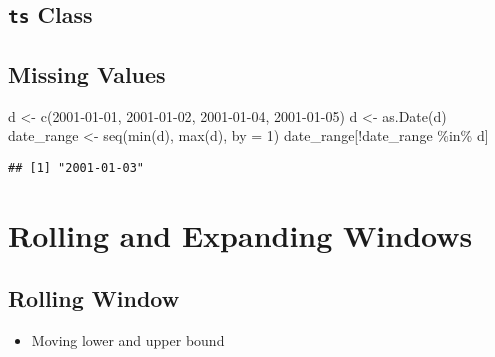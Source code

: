 \documentclass[
]{book}
\newenvironment{Shaded}{\begin{snugshade}}{\end{snugshade}}
\newcommand{\AttributeTok}[1]{\textcolor[rgb]{0.77,0.63,0.00}{#1}}
\newcommand{\DecValTok}[1]{\textcolor[rgb]{0.00,0.00,0.81}{#1}}
\newcommand{\FunctionTok}[1]{\textcolor[rgb]{0.00,0.00,0.00}{#1}}
\newcommand{\NormalTok}[1]{#1}
\newcommand{\OtherTok}[1]{\textcolor[rgb]{0.56,0.35,0.01}{#1}}
\newcommand{\SpecialCharTok}[1]{\textcolor[rgb]{0.00,0.00,0.00}{#1}}
\newcommand{\StringTok}[1]{\textcolor[rgb]{0.31,0.60,0.02}{#1}}
\providecommand{\tightlist}{%
  \setlength{\itemsep}{0pt}\setlength{\parskip}{0pt}}
\begin{document}
\hypertarget{ts-class}{%
\section{\texorpdfstring{\texttt{ts} Class}{ts Class}}\label{ts-class}}

\hypertarget{missing-values}{%
\section{Missing Values}\label{missing-values}}

\begin{Shaded}
\begin{Highlighting}[]
\NormalTok{d }\OtherTok{\textless{}{-}} \FunctionTok{c}\NormalTok{(}\StringTok{\textquotesingle{}2001{-}01{-}01\textquotesingle{}}\NormalTok{, }\StringTok{\textquotesingle{}2001{-}01{-}02\textquotesingle{}}\NormalTok{, }\StringTok{\textquotesingle{}2001{-}01{-}04\textquotesingle{}}\NormalTok{, }\StringTok{\textquotesingle{}2001{-}01{-}05\textquotesingle{}}\NormalTok{)}
\NormalTok{d }\OtherTok{\textless{}{-}} \FunctionTok{as.Date}\NormalTok{(d)}
\NormalTok{date\_range }\OtherTok{\textless{}{-}} \FunctionTok{seq}\NormalTok{(}\FunctionTok{min}\NormalTok{(d), }\FunctionTok{max}\NormalTok{(d), }\AttributeTok{by =} \DecValTok{1}\NormalTok{) }
\NormalTok{date\_range[}\SpecialCharTok{!}\NormalTok{date\_range }\SpecialCharTok{\%in\%}\NormalTok{ d] }
\end{Highlighting}
\end{Shaded}

\begin{verbatim}
## [1] "2001-01-03"
\end{verbatim}

\hypertarget{rolling-and-expanding-windows}{%
\chapter{Rolling and Expanding Windows}\label{rolling-and-expanding-windows}}

\hypertarget{rolling-window}{%
\section{Rolling Window}\label{rolling-window}}

\begin{itemize}
\tightlist
\item
  Moving lower and upper bound
\end{itemize}
\end{document}
